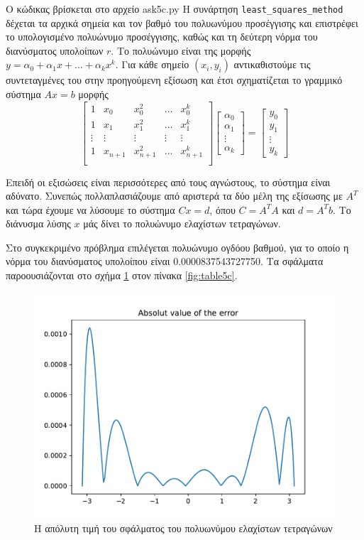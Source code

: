 \documentclass[a4paper,11pt]{article}
\newcommand{\lt}{\latintext}
\newcommand{\gt}{\greektext}
\begin{document}
Ο κώδικας βρίσκεται στο αρχείο \lt ask5c.py \gt Η συνάρτηση \lt \verb|least_squares_method| \gt δέχεται τα αρχικά σημεία και τον βαθμό του πολυωνύμου προσέγγισης και επιστρέφει το υπολογισμένο πολυώνυμο προσέγγισης, καθώς και τη δεύτερη νόρμα του διανύσματος υπολοίπων $r$. Το πολυώνυμο είναι της μορφής $y=\alpha_{0}+\alpha_{1}x+\dots+\alpha_{k}x^{k}$. Για κάθε σημείο $(x_i, y_i)$ αντικαθιστούμε τις συντεταγμένες του στην προηγούμενη εξίσωση και έτσι σχηματίζεται το γραμμικό σύστημα $Ax=b$ μορφής
\[
    \begin{bmatrix}
        1 & x_0 & x_0^2 & \dots & x_0^k \\
        1 & x_1 & x_1^2 & \dots & x_1^k \\
        \vdots & \vdots & \vdots & \vdots & \vdots \\
        1 & x_{n+1} & x_{n+1}^2 & \dots & x_{n+1}^k \\
    \end{bmatrix}
    \begin{bmatrix}
        \alpha_{0} \\
        \alpha_{1} \\
        \vdots \\
        \alpha_{k}
    \end{bmatrix}
    =
    \begin{bmatrix}
        y_{0} \\
        y_{1} \\
        \vdots \\
        y_{k}
    \end{bmatrix}
\]

Επειδή οι εξισώσεις είναι περισσότερες από τους αγνώστους, το σύστημα είναι αδύνατο. Συνεπώς πολλαπλασιάζουμε από αριστερά τα δύο μέλη της εξίσωσης με $A^T$ και τώρα έχουμε να λύσουμε το σύστημα $Cx=d$, όπου $C=A^TA$ και $d=A^Tb$. Το διάνυσμα λύσης $x$ μάς δίνει το πολυώνυμο ελαχίστων τετραγώνων.

Στο συγκεκριμένο πρόβλημα επιλέγεται πολυώνυμο ογδόου βαθμού, για το οποίο η νόρμα του διανύσματος υπολοίπου είναι 0.0000837543727750. Τα σφάλματα παροουσιάζονται στο σχήμα \ref{fig:fig5c} στον πίνακα \ref{fig:table5c}.

\begin{figure}[h!]
    \centering
    \includegraphics[width=0.8\linewidth]{images/figure5c.pdf}
    \centering
     \caption{Η απόλυτη τιμή του σφάλματος του πολυωνύμου ελαχίστων τετραγώνων}
    \label{fig:fig5c}
\end{figure}
\end{document}
